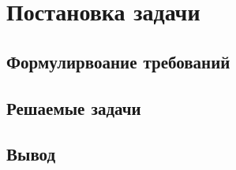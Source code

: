 \chapter{Постановка задачи}
\label{chap:task}
\section{Формулирвоание требований}
\label{sec:features}
\blindtext
\section{Решаемые задачи}
\label{sec:tasks}
\blindtext
\section{Вывод}
\label{sec:task_concl}
\blindtext